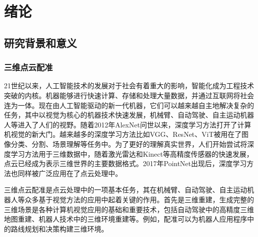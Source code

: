 %
%
%
%
%
%

\chapter{绪论}

\section{研究背景和意义}

\subsection{三维点云配准}
21世纪以来，人工智能技术的发展对于社会有着重大的影响，智能化成为工程技术突破的内核。机器能够进行快速计算、存储和处理大量数据，并通过互联网将社会连为一体。现在由人工智能驱动的新一代机器，它们可以越来越自主地解决复杂的任务，其中以视觉为核心的机器技术快速发展，机械臂、自动驾驶、自主运动机器人等进入了人们的视野。随着2012年AlexNet\cite{krizhevsky2017imagenet}问世以来，深度学习方法打开了计算机视觉的新大门。越来越多的深度学习方法比如VGG\cite{simonyan2014very}、ResNet\cite{he2016deep}、ViT\cite{dosovitskiy2020image}被用在了图像分类、分割、场景理解等任务中。为了更好的理解真实世界，人们开始尝试将深度学习方法用于三维数据中，随着激光雷达和Kinect等高精度传感器的快速发展，点云已经成为表示三维世界的主要数据格式。2017年PointNet\cite{qi2017pointnet}出现后，深度学习方法也同样被广泛应用在了点云处理中。

三维点云配准是点云处理中的一项基本任务\cite{qi2017pointnet,huang2021comprehensive,besl1992method}，其在机械臂、自动驾驶、自主运动机器人等众多基于视觉方法的应用中起着关键的作用。首先是三维重建，生成完整的三维场景是各种计算机视觉应用的基础和重要技术，包括自动驾驶中的高精度三维地图重建、机器人技术中的三维环境重建等。例如，配准可以为机器人应用程序中的路线规划和决策构建三维环境。

